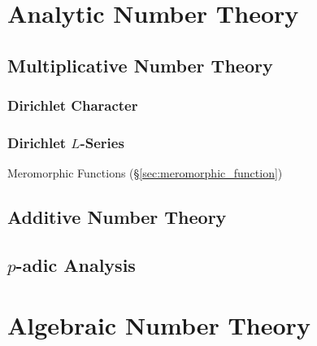 \section{Analytic Number Theory}\label{sec:analytic_number_theory}

\subsection{Multiplicative Number Theory}
\label{sec:multiplicative_number_theory}

\subsubsection{Dirichlet Character}\label{sec:dirichlet_character}

\subsubsection{Dirichlet $L$-Series}\label{sec:l_series}

Meromorphic Functions (\S\ref{sec:meromorphic_function})



\subsection{Additive Number Theory}\label{sec:additive_number_theory}

\subsection{$p$-adic Analysis}\label{sec:padic_analysis}



\section{Algebraic Number Theory}\label{sec:algebraic_number_theory}

